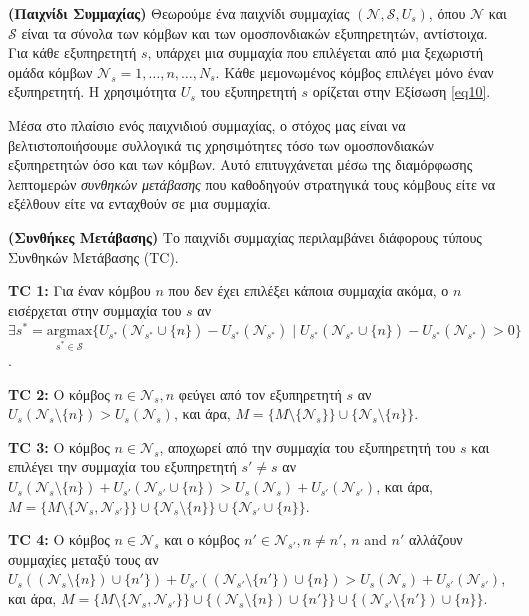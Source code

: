 \begin{definition} \label{Definition 3} \textbf{(Παιχνίδι Συμμαχίας)} Θεωρούμε ένα παιχνίδι συμμαχίας $(\mathcal{N, S}, U_s)$, όπου $\mathcal{N}$ και $\mathcal{S}$ είναι τα σύνολα των κόμβων και των ομοσπονδιακών εξυπηρετητών, αντίστοιχα. Για κάθε εξυπηρετητή $s$, υπάρχει μια συμμαχία που επιλέγεται από μια ξεχωριστή ομάδα κόμβων $\mathcal{N}_s = {1, \dots, n, \dots, N_s}$. Κάθε μεμονωμένος κόμβος επιλέγει μόνο έναν εξυπηρετητή. Η χρησιμότητα $U_s$ του εξυπηρετητή $s$ ορίζεται στην Εξίσωση \ref{eq10}.
\end{definition}

Μέσα στο πλαίσιο ενός παιχνιδιού συμμαχίας, ο στόχος μας είναι να βελτιστοποιήσουμε συλλογικά τις χρησιμότητες τόσο των ομοσπονδιακών εξυπηρετητών όσο και των κόμβων. Αυτό επιτυγχάνεται μέσω της διαμόρφωσης λεπτομερών \textit{συνθηκών μετάβασης} που καθοδηγούν στρατηγικά τους κόμβους είτε να εξέλθουν είτε να ενταχθούν σε μια συμμαχία.

\begin{definition} \label{Definition 4}\textbf{(Συνθήκες Μετάβασης)} Το παιχνίδι συμμαχίας περιλαμβάνει διάφορους τύπους Συνθηκών Μετάβασης (TC).

\noindent
\textbf{TC 1:} Για έναν κόμβου $n$ που δεν έχει επιλέξει κάποια συμμαχία ακόμα, ο $n$  εισέρχεται στην συμμαχία του $s$ αν 
$\exists s^* = \underset{s^* \in \mathcal{S}}{\mathrm{argmax}}\{U_{s^*} (\mathcal{N}_{s^*} \cup \{n\}) - U_{s^*}(\mathcal{N}_{s^*}) \mid U_{s^*} (\mathcal{N}_{s^*} \cup \{n\}) - U_{s^*}(\mathcal{N}_{s^*}) > 0\}$.

\noindent
\textbf{TC 2:} Ο κόμβος $n \in \mathcal{N}_s, n$ φεύγει από τον εξυπηρετητή $s$ αν $U_s(\mathcal{N}_{s} \setminus \{n\}) > U_s(\mathcal{N}_{s})$, και άρα,  $M = \{M \setminus \{\mathcal{N}_{s}\}\} \cup \{\mathcal{N}_{s} \setminus \{n\}\}$.

\noindent
\textbf{TC 3:} Ο κόμβος $n \in \mathcal{N}_{s}$, αποχωρεί από την συμμαχία του εξυπηρετητή του $s$ και επιλέγει την συμμαχία του εξυπηρετητή $s' \neq s$ αν $U_s(\mathcal{N}_{s} \setminus \{n\}) + U_{s'}(\mathcal{N}_{s'} \cup \{n\}) > U_s(\mathcal{N}_{s}) + U_{s'}(\mathcal{N}_{s'})$, και άρα, $M = \{M \setminus \{\mathcal{N}_s,\mathcal{N}_{s{'}}\}\} \cup \{\mathcal{N}_{s}  \setminus \{n\}\} \cup \{\mathcal{N}_{s'}  \cup \{n\}\}$.

\noindent
\textbf{TC 4:} Ο κόμβος $n\in \mathcal{N}_{s}$ και ο κόμβος $n' \in \mathcal{N}_{s'}, n \neq n'$, $n$ and $n'$ αλλάζουν συμμαχίες μεταξύ τους αν $U_s((\mathcal{N}_{s} \setminus \{n\}) \cup \{n'\}) + U_{s'}((\mathcal{N}_{s'} \setminus \{n'\} )\cup \{n\}) > U_s(\mathcal{N}_{s}) + U_{s'}(\mathcal{N}_{s'})$, και άρα, $M = \{M \setminus \{\mathcal{N}_s,\mathcal{N}_{s{'}}\}\} \cup \{(\mathcal{N}_{s}  \setminus \{n\}) \cup \{n'\}\} \cup \{(\mathcal{N}_{s'}  \setminus \{n'\}) \cup \{n\}\}$.
\end{definition}

